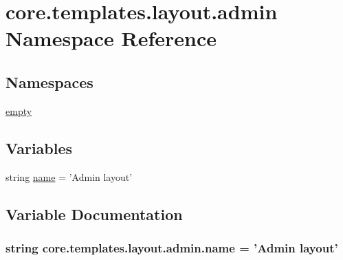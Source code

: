 \hypertarget{namespacecore_1_1templates_1_1layout_1_1admin}{\section{core.\-templates.\-layout.\-admin Namespace Reference}
\label{namespacecore_1_1templates_1_1layout_1_1admin}
}
\subsection*{Namespaces}
\begin{DoxyCompactItemize}
\item 
\hyperlink{namespacecore_1_1templates_1_1layout_1_1admin_1_1empty}{empty}
\end{DoxyCompactItemize}
\subsection*{Variables}
\begin{DoxyCompactItemize}
\item 
string \hyperlink{namespacecore_1_1templates_1_1layout_1_1admin_af7d38b988955e21e8245afa44686ce60}{name} = 'Admin layout'
\end{DoxyCompactItemize}


\subsection{Variable Documentation}
\hypertarget{namespacecore_1_1templates_1_1layout_1_1admin_af7d38b988955e21e8245afa44686ce60}{
\subsubsection[{name}]{\setlength{\rightskip}{0pt plus 5cm}string core.\-templates.\-layout.\-admin.\-name = 'Admin layout'}}\label{namespacecore_1_1templates_1_1layout_1_1admin_af7d38b988955e21e8245afa44686ce60}

